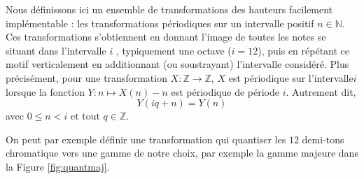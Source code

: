 Nous définissons ici un ensemble de transformations des hauteurs facilement implémentable : les transformations périodiques sur un intervalle positif $n\in \mathbb{N}$. Ces transformations s'obtiennent en donnant l'image de toutes les notes se situant dans l'intervalle $i$ , typiquement une octave ($i = 12$), puis en répétant ce motif verticalement en additionnant (ou soustrayant) l'intervalle considéré. Plus précisément, pour une transformation $X : \mathbb{Z} \rightarrow \mathbb{Z}$, $X$ est périodique sur l'intervalle$i$ lorsque la fonction $Y : n \mapsto X(n) - n$ est périodique de période $i$. Autrement dit, $$Y(iq + n) = Y(n)$$ 
\noindent avec  $0 \leq n < i$ et tout $q\in \mathbb{Z}$.

On peut par exemple définir une transformation qui quantiser les $12$ demi-tons chromatique vers une gamme de notre choix, par exemple la gamme majeure dans la Figure \ref{fig:quantmaj}.



